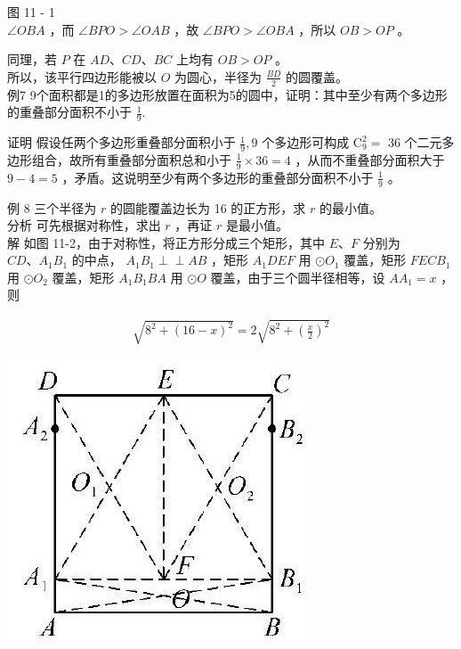 \documentclass[10pt]{article}
\def\Perp{\perp\!\!\!\perp}
\begin{document}
图 11 - 1\\
$\angle O B A$ ，而 $\angle B P O>\angle O A B$ ，故 $\angle B P O>\angle O B A$ ，所以 $O B>O P$ 。

同理，若 $P$ 在 $A D 、 C D 、 B C$ 上均有 $O B>O P$ 。\\
所以，该平行四边形能被以 $O$ 为圆心，半径为 $\frac{B D}{2}$ 的圆覆盖。\\
例7 9个面积都是1的多边形放置在面积为5的圆中，证明：其中至少有两个多边形的重叠部分面积不小于 $\frac{1}{9}$.

证明 假设任两个多边形重叠部分面积小于 $\frac{1}{9}, 9$ 个多边形可构成 $\mathrm{C}_{9}^{2}=$ 36 个二元多边形组合，故所有重叠部分面积总和小于 $\frac{1}{9} \times 36=4$ ，从而不重叠部分面积大于 $9-4=5$ ，矛盾。这说明至少有两个多边形的重叠部分面积不小于 $\frac{1}{9}$ 。

例 8 三个半径为 $r$ 的圆能覆盖边长为 16 的正方形，求 $r$ 的最小值。\\
分析 可先根据对称性，求出 $r$ ，再证 $r$ 是最小值。\\
解 如图 11-2，由于对称性，将正方形分成三个矩形，其中 $E 、 F$ 分别为 $C D 、 A_{1} B_{1}$ 的中点， $A_{1} B_{1} \Perp A B$ ，矩形 $A_{1} D E F$ 用 $\odot O_{1}$ 覆盖，矩形 $F E C B_{1}$用 $\odot O_{2}$ 覆盖，矩形 $A_{1} B_{1} B A$ 用 $\odot O$ 覆盖，由于三个圆半径相等，设 $A A_{1}=x$ ，则

\begin{align*}
\sqrt{8^{2}+(16-x)^{2}}=2 \sqrt{8^{2}+\left(\frac{x}{2}\right)^{2}}
\end{align*}

\begin{center}
\includegraphics[max width=\textwidth]{2024_10_30_66b8e5e701da2093c133g-082(1)}
\end{center}
\end{document}
